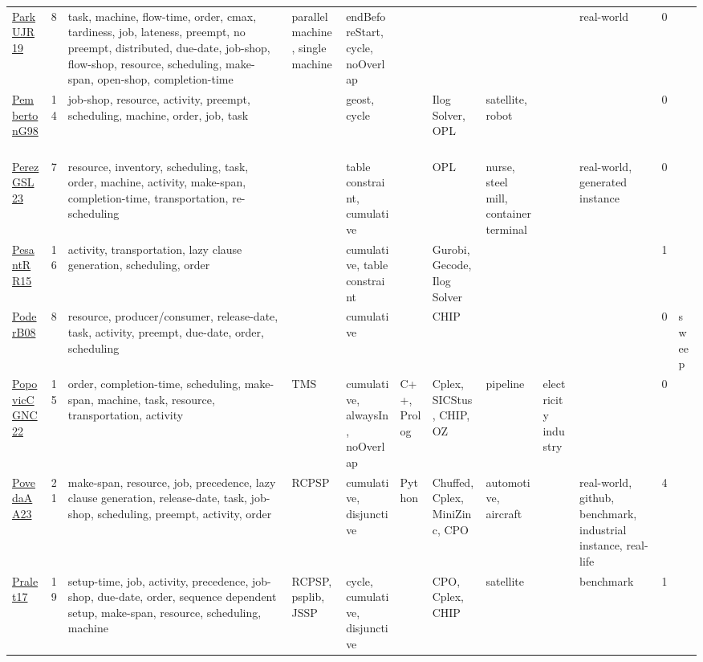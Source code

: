{\begin{longtable}{p{3cm}rp{4cm}p{1.5cm}p{2cm}p{1.5cm}p{1.5cm}p{1.5cm}p{1.5cm}p{2cm}rp{1.5cm}}
\href{papers/ParkUJR19.pdf}{ParkUJR19}~\cite{ParkUJR19} & 8 & task, machine, flow-time, order, cmax, tardiness, job, lateness, preempt, no preempt, distributed, due-date, job-shop, flow-shop, resource, scheduling, make-span, open-shop, completion-time & parallel machine, single machine & endBeforeStart, cycle, noOverlap &  &  &  &  & real-world & 0 & \\
\href{papers/PembertonG98.pdf}{PembertonG98}~\cite{PembertonG98} & 14 & job-shop, resource, activity, preempt, scheduling, machine, order, job, task &  & geost, cycle &  & Ilog Solver, OPL & satellite, robot &  &  & 0 & \\
\href{papers/PerezGSL23.pdf}{PerezGSL23}~\cite{PerezGSL23} & 7 & resource, inventory, scheduling, task, order, machine, activity, make-span, completion-time, transportation, re-scheduling &  & table constraint, cumulative &  & OPL & nurse, steel mill, container terminal &  & real-world, generated instance & 0 & \\
\href{papers/PesantRR15.pdf}{PesantRR15}~\cite{PesantRR15} & 16 & activity, transportation, lazy clause generation, scheduling, order &  & cumulative, table constraint &  & Gurobi, Gecode, Ilog Solver &  &  &  & 1 & \\
\href{papers/PoderB08.pdf}{PoderB08}~\cite{PoderB08} & 8 & resource, producer/consumer, release-date, task, activity, preempt, due-date, order, scheduling &  & cumulative &  & CHIP &  &  &  & 0 & sweep\\
\href{papers/PopovicCGNC22.pdf}{PopovicCGNC22}~\cite{PopovicCGNC22} & 15 & order, completion-time, scheduling, make-span, machine, task, resource, transportation, activity & TMS & cumulative, alwaysIn, noOverlap & C++, Prolog & Cplex, SICStus, CHIP, OZ & pipeline & electricity industry &  & 0 & \\
\href{papers/PovedaAA23.pdf}{PovedaAA23}~\cite{PovedaAA23} & 21 & make-span, resource, job, precedence, lazy clause generation, release-date, task, job-shop, scheduling, preempt, activity, order & RCPSP & cumulative, disjunctive & Python & Chuffed, Cplex, MiniZinc, CPO & automotive, aircraft &  & real-world, github, benchmark, industrial instance, real-life & 4 & \\
\href{papers/Pralet17.pdf}{Pralet17}~\cite{Pralet17} & 19 & setup-time, job, activity, precedence, job-shop, due-date, order, sequence dependent setup, make-span, resource, scheduling, machine & RCPSP, psplib, JSSP & cycle, cumulative, disjunctive &  & CPO, Cplex, CHIP & satellite &  & benchmark & 1 & \\

\end{longtable}}
